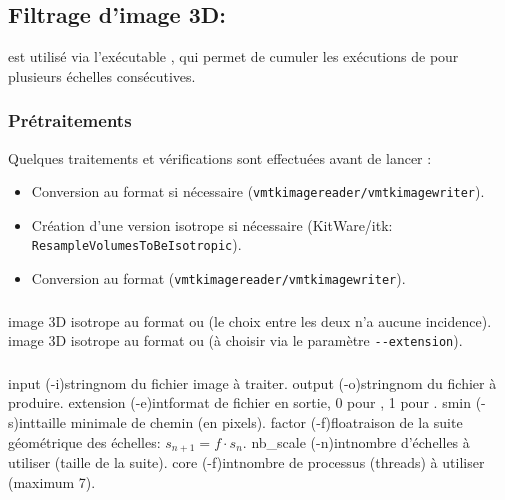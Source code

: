 	\subsection{Filtrage d'image 3D: \rorpo}
	\label{brique:rorpo}
	
\rorpo est utilisé via l'exécutable , qui permet de cumuler les exécutions de \rorpo pour plusieurs échelles consécutives.

	\subsubsection{Prétraitements}

Quelques traitements et vérifications sont effectuées avant de lancer \rorpo:

\begin{itemize}
\item Conversion au format \mha si nécessaire (\texttt{vmtkimagereader/vmtkimagewriter}).
\item Création d'une version isotrope si nécessaire (KitWare/itk: \texttt{ResampleVolumesToBeIsotropic}).
\item Conversion au format \nii (\texttt{vmtkimagereader/vmtkimagewriter}).
\end{itemize}

	\subsubsection{\ioT}

\iolist
{image 3D isotrope au format \mha ou \nii (le choix entre les deux n'a aucune incidence).}
{image 3D isotrope au format \mha ou \nii (à choisir via le paramètre \texttt{-{}-extension}).}



	\subsubsection{\argsT}
	\label{brique:rorpo:p}

\args
{input (-i)}{}{string}{nom du fichier image à traiter.}
{output (-o)}{}{string}{nom du fichier à produire.}
{extension (-e)}{}{int}{format de fichier en sortie, 0 pour \mha, 1 pour \nii.}
{smin (-s)}{}{int}{taille minimale de chemin (en pixels).}
{factor (-f)}{}{float}{raison de la suite géométrique des échelles: $s_{n+1} = f \cdot s_n$.}
{nb\_scale (-n)}{}{int}{nombre d'échelles à utiliser (taille de la suite).}
{core (-f)}{}{int}{nombre de processus (threads) à utiliser (maximum 7).}
\stoparg



